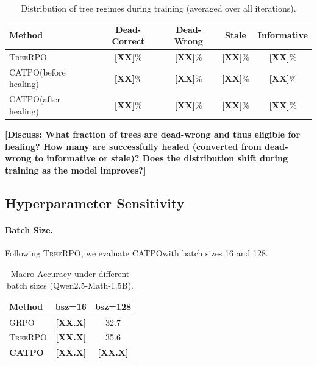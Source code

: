 \documentclass{article} %
\newcommand{\CATPO}{\textsc{CATPO}}
\newcommand{\TreeRPO}{\textsc{TreeRPO}}
\newcommand{\placeholder}[1]{{\color{red}\textbf{[#1]}}}
\begin{document}
\begin{table}[h]
    \centering
    \renewcommand\arraystretch{1.2}
    \caption{Distribution of tree regimes during training (averaged over all iterations).}
    \begin{tabular}{l|cccc}
    \toprule
    \textbf{Method} & \textbf{Dead-Correct} & \textbf{Dead-Wrong} & \textbf{Stale} & \textbf{Informative} \\
    \midrule
    \TreeRPO & \placeholder{XX}\% & \placeholder{XX}\% & \placeholder{XX}\% & \placeholder{XX}\% \\
    \CATPO (before healing) & \placeholder{XX}\% & \placeholder{XX}\% & \placeholder{XX}\% & \placeholder{XX}\% \\
    \CATPO (after healing) & \placeholder{XX}\% & \placeholder{XX}\% & \placeholder{XX}\% & \placeholder{XX}\% \\
    \bottomrule
    \end{tabular}
    \label{tab:regimes_dist}
\end{table}

\placeholder{Discuss: What fraction of trees are dead-wrong and thus eligible for healing? How many are successfully healed (converted from dead-wrong to informative or stale)? Does the distribution shift during training as the model improves?}


\subsection{Hyperparameter Sensitivity}

\paragraph{Batch Size.} Following \TreeRPO, we evaluate \CATPO with batch sizes 16 and 128.

\begin{table}[h]
    \centering
    \begin{tabular}{l|cc}
    \toprule
    \textbf{Method} & \textbf{bsz=16} & \textbf{bsz=128} \\
    \midrule
    GRPO & \placeholder{XX.X} & 32.7 \\
    \TreeRPO & \placeholder{XX.X} & 35.6 \\
    \textbf{\CATPO} & \placeholder{XX.X} & \placeholder{XX.X} \\
    \bottomrule
    \end{tabular}
    \caption{Macro Accuracy under different batch sizes (Qwen2.5-Math-1.5B).}
    \label{tab:batchsize}
\end{table}
\end{document}
